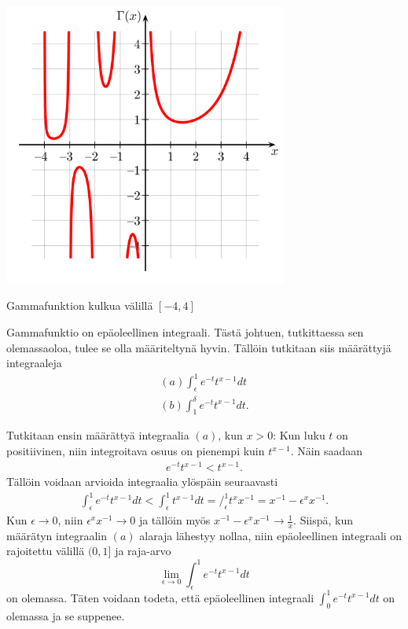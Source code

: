 \documentclass[12pt]{article}
\theoremstyle{definition}
\theoremstyle{plain}
\numberwithin{equation}{section}
\begin{document}
\begin{center}
\includegraphics[width=0.7\textwidth]{Gamma-function.png} \newline
\caption{Gammafunktion kulkua välillä $[-4,4]$}
\end{center}
\newpage
Gammafunktio on epäoleellinen integraali. Tästä johtuen, tutkittaessa sen olemassaoloa, tulee se olla määriteltynä hyvin. Tällöin tutkitaan siis määrättyjä integraaleja
\begin{align*}
    (a) \int_{\epsilon}^{1} e^{-t} t^{x-1} dt \\
    (b) \int_{1}^{\delta} e^{-t} t^{x-1} dt.
\end{align*}

Tutkitaan ensin määrättyä integraalia $(a)$, kun $x>0$:\newline
Kun luku $t$ on positiivinen, niin integroitava osuus on pienempi kuin $t^{x-1}$. Näin saadaan
\begin{align*}
    e^{-t} t^{x-1} < t^{x-1}.
\end{align*} 
Tällöin voidaan arvioida integraalia ylöspäin seuraavasti 
\begin{align*}
    \int_{\epsilon}^{1} e^{-t} t^{x-1} dt < \int_{\epsilon}^{1} t^{x-1} dt = \Big/_\epsilon^1 {t^x}x^{-1} = {x}^{-1}-\epsilon^{x}{x}^{-1}.
\end{align*}
Kun $\epsilon \rightarrow 0$, niin $\epsilon^{x}x^{-1}\rightarrow 0$ ja tällöin myös $x^{-1}-\epsilon{^x}x^{-1} \rightarrow \frac{1}{x}$. Siispä, kun määrätyn integraalin $(a)$ alaraja lähestyy nollaa, niin epäoleellinen integraali on  rajoitettu välillä $(0, 1]$ ja raja-arvo
\begin{equation*}
    \lim_{\epsilon\to0}\int_{\epsilon}^{1}e^{-t}t^{x-1}dt
\end{equation*}
on olemassa. Täten voidaan todeta, että epäoleellinen integraali $\int_{0}^{1} e^{-t} t^{x-1} dt$ on olemassa ja se suppenee. \newline
\end{document}
